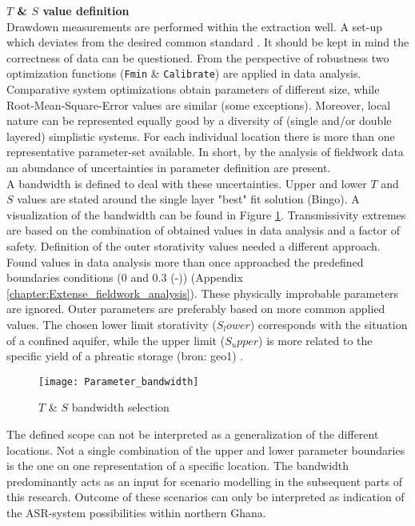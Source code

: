\textbf{$T$ \& $S$ value definition} \\
Drawdown measurements are performed within the extraction well. A set-up which deviates from the desired common standard \citep{Kruseman2000}. It should be kept in mind the correctness of data can be questioned. From the perspective of robustness two optimization functions (\texttt{Fmin} \& \texttt{Calibrate}) are applied in data analysis. Comparative system optimizations obtain parameters of different size, while Root-Mean-Square-Error values are similar (some exceptions). Moreover, local nature can be represented equally good by a diversity of (single and/or double layered) simplistic systems. For each individual location there is more than one representative parameter-set available. In short, by the analysis of fieldwork data an abundance of uncertainties in parameter definition are present. \\

A bandwidth is defined to deal with these uncertainties. Upper and lower $T$ and $S$ values are stated around the single layer "best" fit solution (Bingo). A visualization of the bandwidth can be found in Figure \ref{fig:Parameter_bandwidth}.   Transmissivity extremes are based on the combination of obtained values in data analysis and a factor of safety. Definition of the outer storativity values needed a different approach. Found values in data analysis more than once approached the predefined boundaries conditions (0 and 0.3 (-)) (Appendix \ref{chapter:Extense_fieldwork_analysis}). These physically improbable parameters are ignored. Outer parameters are preferably based on more common applied values. The chosen lower limit storativity ($S_lower$) corresponds with the situation of a confined aquifer, while the upper limit ($S_upper$) is more related to the specific yield of a phreatic storage (bron: geo1) \citep{Strack1989,Fitts2012}. \\

\begin{figure}[h!]
 \centering
 \texttt{[image: Parameter\_bandwidth]}
 \captionsetup{justification=centering} 
 \caption{$T$ \& $S$ bandwidth selection}
 \label{fig:Parameter_bandwidth}
\end{figure}

The defined scope can not be interpreted as a generalization of the different locations. Not a single combination of the upper and lower parameter boundaries is the one on one representation of a specific location. The bandwidth predominantly acts as an input for scenario modelling in the subsequent parts of this research. Outcome of these scenarios can only be interpreted as indication of the ASR-system possibilities within northern Ghana. 